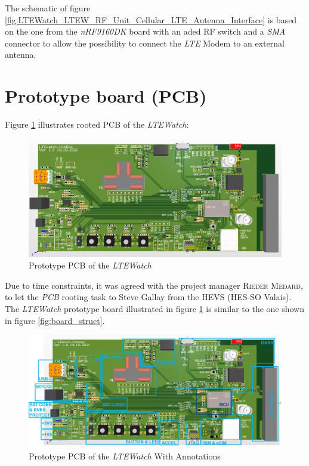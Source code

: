 \documentclass[report.tex]{subfiles}
\begin{document}
The schematic of figure \ref{fig:LTEWatch_LTEW_RF_Unit_Cellular_LTE_Antenna_Interface} is based on the one from the \textit{nRF9160DK}\cite{nRF9160DK} board with an aded RF switch and a \textit{SMA} connector to allow the possibility to connect the \textit{LTE} Modem to an external antenna.

\section{Prototype board (PCB)}

Figure \ref{fig:pcb_board} illustrates rooted PCB of the \textit{LTEWatch}:

\begin{figure}[H]
	\centering
	\includegraphics[width=1\textwidth]{Include/Figure/Hardware/pcb_board.png}
	\caption{Prototype PCB of the \textit{LTEWatch}}
	\label{fig:pcb_board}
\end{figure}

Due to time constraints, it was agreed with the project manager \textsc{Rieder Medard}, to let the \textit{PCB} rooting task to Steve Gallay from the HEVS (HES-SO Valais).\\

The \textit{LTEWatch} prototype board illustrated in figure \ref{fig:pcb_board} is similar to the one shown in figure \ref{fig:board_struct}. 

\begin{figure}[H]
	\centering
	\includegraphics[width=1\textwidth]{Include/Figure/Hardware/pcb.png}
	\caption{Prototype PCB of the \textit{LTEWatch} With Annotations}
	\label{fig:pcb}
\end{figure}
\end{document}
